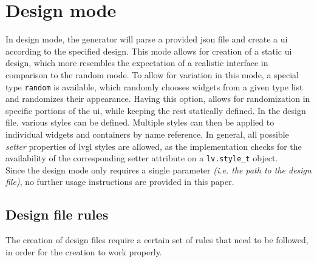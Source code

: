 \documentclass[Bachelor, BIC, english, fhCitStyle, IEEE]{BASE/twbook} %
\newcommand{\nocontentsline}[3]{}
\newcommand{\hidsubsection}[1]{\bgroup\let\addcontentsline=\nocontentsline\subsection{#1}\egroup}
\def\code#1{\texttt{#1}}
\begin{document}
\section{Design mode}
In design mode, the generator will parse a provided \ac{json} file and create a \ac{ui} according to the specified design. This mode allows for creation of a static \ac{ui} design, which more resembles the expectation of a realistic interface in comparison to the random mode. To allow for variation in this mode, a special type \code{random} is available, which randomly chooses widgets from a given type list and randomizes their appearance. Having this option, allows for randomization in specific portions of the \ac{ui}, while keeping the rest statically defined. In the design file, various styles can be defined. Multiple styles can then be applied to individual widgets and containers by name reference. In general, all possible \textit{setter} properties of \ac{lvgl} styles are allowed, as the implementation checks for the availability of the corresponding setter attribute on a \code{lv.style\_t} object.\\
Since the design mode only requires a single parameter \textit{(i.e. the path to the design file)}, no further usage instructions are provided in this paper.
\hidsubsection{Design file rules}
The creation of design files require a certain set of rules that need to be followed, in order for the creation to work properly.
\end{document}
